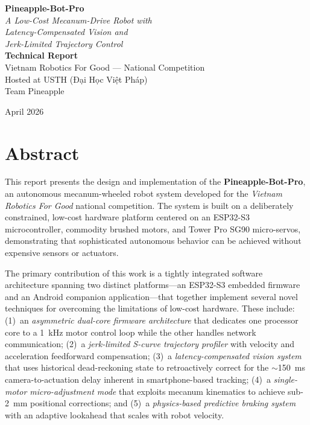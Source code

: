 \documentclass[12pt, a4paper, twoside]{article}
\begin{document}
\begin{titlepage}
    \centering
    \vspace*{2cm}

    {\Huge\bfseries Pineapple-Bot-Pro}\\[0.5cm]
    {\LARGE\itshape A Low-Cost Mecanum-Drive Robot with\\Latency-Compensated Vision and\\Jerk-Limited Trajectory Control}\\[2cm]

    {\Large\bfseries Technical Report}\\[0.5cm]
    {\large Vietnam Robotics For Good --- National Competition}\\[0.3cm]
    {\large Hosted at USTH ({\selectfont Đại Học Việt Pháp})}\\[2.5cm]

    {\Large Team Pineapple}\\[2cm]

    \vfill

    {\large April 2026}
\end{titlepage}

\newpage
\tableofcontents
\newpage

\section{Abstract}

This report presents the design and implementation of the \textbf{Pineapple-Bot-Pro}, an autonomous mecanum-wheeled robot system developed for the \emph{Vietnam Robotics For Good} national competition. The system is built on a deliberately constrained, low-cost hardware platform centered on an ESP32-S3 microcontroller, commodity brushed motors, and Tower Pro SG90 micro-servos, demonstrating that sophisticated autonomous behavior can be achieved without expensive sensors or actuators.

The primary contribution of this work is a tightly integrated software architecture spanning two distinct platforms---an ESP32-S3 embedded firmware and an Android companion application---that together implement several novel techniques for overcoming the limitations of low-cost hardware. These include: (1)~an \emph{asymmetric dual-core firmware architecture} that dedicates one processor core to a \SI{1}{\kilo\hertz} motor control loop while the other handles network communication; (2)~a \emph{jerk-limited S-curve trajectory profiler} with velocity and acceleration feedforward compensation; (3)~a \emph{latency-compensated vision system} that uses historical dead-reckoning state to retroactively correct for the {$\sim$\SI{150}{\milli\second}} camera-to-actuation delay inherent in smartphone-based tracking; (4)~a \emph{single-motor micro-adjustment mode} that exploits mecanum kinematics to achieve sub-\SI{2}{\milli\metre} positional corrections; and (5)~a \emph{physics-based predictive braking system} with an adaptive lookahead that scales with robot velocity.
\end{document}
